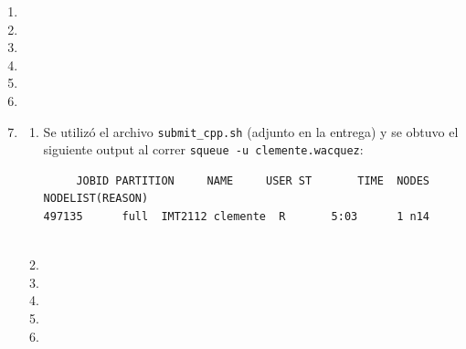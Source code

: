 \begin{enumerate}[label=\bf\arabic*.]
\begin{enumerate}[label=\alph*)]
				De esta forma, la cantidad de procesos viene dada por $p = rc$, donde $r$ y $c$ son las cantidades de filas y columnas respectivamente que tendrá cada submatriz $A_{ij}$.
			\item Dados dos vectores $\textbf{x},\textbf{y} \in \R^n$, podemos paralelizar su producto sobre $P$ procesos asignando a cada proceso $p_i$ $\floor{n/p}$ filas para $i=0,\dots,P-2$ y $n \text{ mod } p$ filas para $p_{P-1}$. El procedimiento desde aquí es como sigue:
				\begin{itemize}
					\item Cada $p_i$ calcula
						\[s_i = \sum_{k=n_{i}}^{n_{i+1} - 1}x_ky_k\]
						Donde $n_i$ es el índice de la primera fila asignada a $p_i$. Se puede definir este valor con la expresión
						\[
							n_i = \begin{cases}
								i\floor{\frac{n}{P}} & \text{si } i=0,\dots,P-2 \\
								P & \text{si } i=P
							\end{cases}
						\]
					\item Para $i>0$, cada $p_i$ envía $s_i$ a $p_0$
					\item $p_0$ calcula la suma
						\[
							s = s_0 + \cdots + s_{P-1} = \textbf{x}\cdot\textbf{y}
						\]
				\end{itemize}
		\end{enumerate} 
	\item
	\item
	\item
	\item
	\item
	\item
	\item \begin{enumerate}[label=\alph*)]
			\item Se utilizó el archivo \texttt{submit\_cpp.sh} (adjunto en la entrega) y se obtuvo el siguiente output al correr \texttt{squeue -u clemente.wacquez}:
				\begin{verbatim}
	 JOBID PARTITION     NAME     USER ST       TIME  NODES NODELIST(REASON)
497135      full  IMT2112 clemente  R       5:03      1 n14
					
				\end{verbatim}
			\item
			\item
			\item
			\item
			\item
		
	\end{enumerate}
\end{enumerate}

